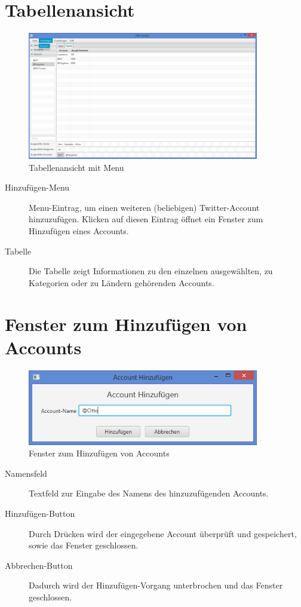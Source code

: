 \section{Tabellenansicht}

\begin{figure}[h]
	\centering
	\includegraphics[width=0.9\textwidth]{img/DemoGUITabelleAddAccount.png}
	\caption{Tabellenansicht mit Menu}
	\label{c:Tabellenansicht mit Menu}
\end{figure}

\begin{description}
	\item[Hinzufügen-Menu] Menu-Eintrag, um einen weiteren (beliebigen) Twitter-Account hinzuzufügen. Klicken auf diesen Eintrag öffnet ein Fenster zum Hinzufügen eines Accounts.
	\item[Tabelle] Die Tabelle zeigt Informationen zu den einzelnen ausgewählten, zu Kategorien oder zu Ländern gehörenden Accounts.
\end{description}

\section{Fenster zum Hinzufügen von Accounts}

\begin{figure}[h]
	\centering
	\includegraphics[width=0.9\textwidth]{img/DemoGUIAddAccount.png}
	\caption{Fenster zum Hinzufügen von Accounts}
	\label{c:Fenster zum Hinzufügen von Accounts}
\end{figure}

\begin{description}
	\item[Namensfeld] Textfeld zur Eingabe des Namens des hinzuzufügenden Accounts.
	\item[Hinzufügen-Button] Durch Drücken wird der eingegebene Account überprüft und gespeichert, sowie das Fenster geschlossen.
	\item[Abbrechen-Button] Dadurch wird der Hinzufügen-Vorgang unterbrochen und das Fenster geschlossen.
\end{description}
